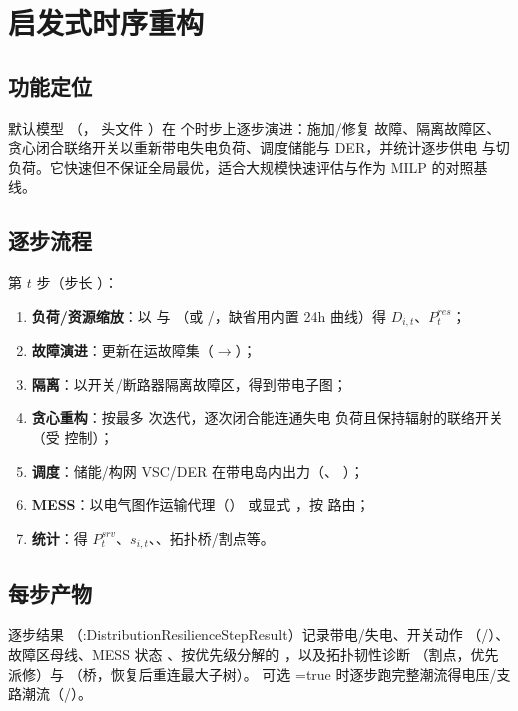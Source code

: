 \section{启发式时序重构}\label{sec:res-heuristic}

\subsection{功能定位}
默认模型 （，
头文件 ）在  个时步上逐步演进：施加/修复
故障、隔离故障区、贪心闭合联络开关以重新带电失电负荷、调度储能与 DER，并统计逐步供电
与切负荷。它快速但不保证全局最优，适合大规模快速评估与作为 MILP 的对照基线。

\subsection{逐步流程}
第 $t$ 步（步长 ）：
\begin{enumerate}
  \item \textbf{负荷/资源缩放}：以  与 
        （或 /，缺省用内置 24h 曲线）得 $D_{i,t}$、$P^{res}_t$；
  \item \textbf{故障演进}：更新在运故障集（$\to$）；
  \item \textbf{隔离}：以开关/断路器隔离故障区，得到带电子图；
  \item \textbf{贪心重构}：按最多  次迭代，逐次闭合能连通失电
        负荷且保持辐射的联络开关（受  控制）；
  \item \textbf{调度}：储能/构网 VSC/DER 在带电岛内出力（、
        ）；
  \item \textbf{MESS}：以电气图作运输代理（）
        或显式 ，按  路由；
  \item \textbf{统计}：得 $P_t^{srv}$、$s_{i,t}$、、拓扑桥/割点等。
\end{enumerate}

\subsection{每步产物}
逐步结果 （:DistributionResilienceStepResult）记录带电/失电、开关动作
（/）、故障区母线、MESS 状态
、按优先级分解的 ，以及拓扑韧性诊断
（割点，优先派修）与 （桥，恢复后重连最大子树）。
可选 =true 时逐步跑完整潮流得电压/支路潮流（/）。
